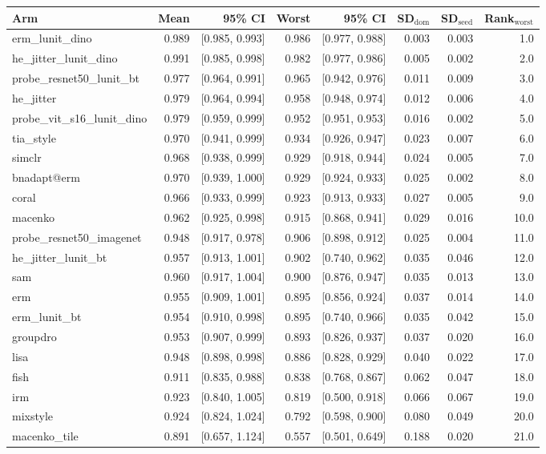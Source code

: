 \begin{tabular}{lrrrrrrr}
\toprule
Arm & Mean & 95\% CI & Worst & 95\% CI & SD$_\text{dom}$ & SD$_\text{seed}$ & Rank$_\text{worst}$ \\
\midrule
erm\_lunit\_dino & 0.989 & [0.985, 0.993] & 0.986 & [0.977, 0.988] & 0.003 & 0.003 & 1.0 \\
he\_jitter\_lunit\_dino & 0.991 & [0.985, 0.998] & 0.982 & [0.977, 0.986] & 0.005 & 0.002 & 2.0 \\
probe\_resnet50\_lunit\_bt & 0.977 & [0.964, 0.991] & 0.965 & [0.942, 0.976] & 0.011 & 0.009 & 3.0 \\
he\_jitter & 0.979 & [0.964, 0.994] & 0.958 & [0.948, 0.974] & 0.012 & 0.006 & 4.0 \\
probe\_vit\_s16\_lunit\_dino & 0.979 & [0.959, 0.999] & 0.952 & [0.951, 0.953] & 0.016 & 0.002 & 5.0 \\
tia\_style & 0.970 & [0.941, 0.999] & 0.934 & [0.926, 0.947] & 0.023 & 0.007 & 6.0 \\
simclr & 0.968 & [0.938, 0.999] & 0.929 & [0.918, 0.944] & 0.024 & 0.005 & 7.0 \\
bnadapt@erm & 0.970 & [0.939, 1.000] & 0.929 & [0.924, 0.933] & 0.025 & 0.002 & 8.0 \\
coral & 0.966 & [0.933, 0.999] & 0.923 & [0.913, 0.933] & 0.027 & 0.005 & 9.0 \\
macenko & 0.962 & [0.925, 0.998] & 0.915 & [0.868, 0.941] & 0.029 & 0.016 & 10.0 \\
probe\_resnet50\_imagenet & 0.948 & [0.917, 0.978] & 0.906 & [0.898, 0.912] & 0.025 & 0.004 & 11.0 \\
he\_jitter\_lunit\_bt & 0.957 & [0.913, 1.001] & 0.902 & [0.740, 0.962] & 0.035 & 0.046 & 12.0 \\
sam & 0.960 & [0.917, 1.004] & 0.900 & [0.876, 0.947] & 0.035 & 0.013 & 13.0 \\
erm & 0.955 & [0.909, 1.001] & 0.895 & [0.856, 0.924] & 0.037 & 0.014 & 14.0 \\
erm\_lunit\_bt & 0.954 & [0.910, 0.998] & 0.895 & [0.740, 0.966] & 0.035 & 0.042 & 15.0 \\
groupdro & 0.953 & [0.907, 0.999] & 0.893 & [0.826, 0.937] & 0.037 & 0.020 & 16.0 \\
lisa & 0.948 & [0.898, 0.998] & 0.886 & [0.828, 0.929] & 0.040 & 0.022 & 17.0 \\
fish & 0.911 & [0.835, 0.988] & 0.838 & [0.768, 0.867] & 0.062 & 0.047 & 18.0 \\
irm & 0.923 & [0.840, 1.005] & 0.819 & [0.500, 0.918] & 0.066 & 0.067 & 19.0 \\
mixstyle & 0.924 & [0.824, 1.024] & 0.792 & [0.598, 0.900] & 0.080 & 0.049 & 20.0 \\
macenko\_tile & 0.891 & [0.657, 1.124] & 0.557 & [0.501, 0.649] & 0.188 & 0.020 & 21.0 \\
\bottomrule
\end{tabular}
